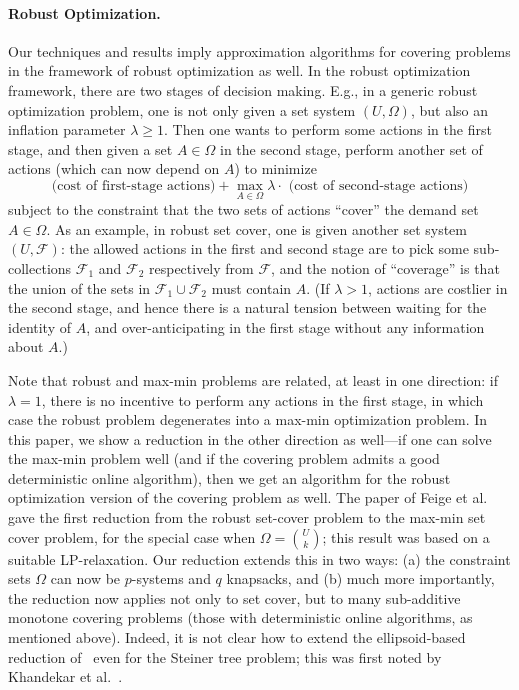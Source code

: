 \documentclass[11pt,letterpaper]{article}
\def\f{\ensuremath {\mathcal{F}}\xspace}
\newcommand{\I}{{\Omega}}
\newcounter{note}[section]
\begin{document}
\paragraph{Robust Optimization.}
Our techniques and results imply approximation algorithms for covering
problems in the framework of robust optimization as well. In the robust
optimization framework, there are two stages of decision making. E.g.,
in a generic robust optimization problem, one is not only given a set
system $(U, \I)$, but also an inflation parameter $\lambda \geq 1$. Then
one wants to perform some actions in the first stage, and then given a
set $A \in \I$ in the second stage, perform another set of actions
(which can now depend on $A$) to minimize
\[ \text{(cost of first-stage actions)} + \max_{A \in \I} \lambda \cdot
\text{ (cost of second-stage actions)} \] subject to the constraint that
the two sets of actions ``cover'' the demand set $A \in \I$. As an
example, in robust set cover, one is given another set system $(U, \f)$:
the allowed actions in the first and second stage are to pick some
sub-collections $\f_1$ and $\f_2$ respectively from $\f$, and the notion
of ``coverage'' is that the union of the sets in $\f_1 \cup \f_2$ must
contain $A$. (If $\lambda > 1$, actions are costlier in the second
stage, and hence there is a natural tension between waiting for the
identity of $A$, and over-anticipating in the first stage without any
information about $A$.)

Note that robust and max-min problems are related, at least in one direction: if $\lambda = 1$, there is no incentive
to perform any actions in the first stage, in which case the robust problem degenerates into a max-min optimization
problem. In this paper, we show a reduction in the other direction as well---if one can solve the max-min problem well
(and if the covering problem admits a good deterministic online algorithm), then we get an algorithm for the robust
optimization version of the covering problem as well. The paper of Feige et al.~\cite{FJMM07} gave the first reduction
from the robust set-cover problem to the max-min set cover problem, for the special case when $\I = \binom{U}{k}$; this
result was based on a suitable LP-relaxation. Our reduction extends this in two ways: (a) the constraint sets $\I$ can
now be $p$-systems and $q$ knapsacks, and (b) much more importantly, the reduction now applies not only to set cover,
but to many sub-additive monotone covering problems (those with deterministic online algorithms, as mentioned above).
Indeed, it is not clear how to extend the ellipsoid-based reduction of~\cite{FJMM07} even for the Steiner tree problem;
this was first noted by Khandekar et al.~\cite{KKMS08}.
\end{document}
